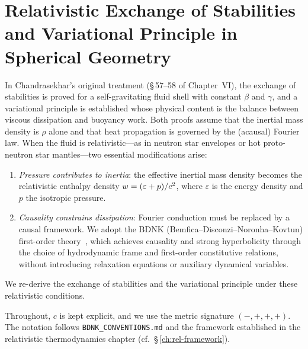 
\chapter{Relativistic Exchange of Stabilities and Variational Principle
in Spherical Geometry}
\label{ch:rel-ch6-57-58}

In Chandrasekhar's original treatment (\S\,57--58 of Chapter~VI), the
exchange of stabilities is proved for a self-gravitating fluid shell
with constant $\beta$ and $\gamma$, and a variational principle is
established whose physical content is the balance between viscous
dissipation and buoyancy work.  Both proofs assume that the inertial
mass density is $\rho$ alone and that heat propagation is governed by
the (acausal) Fourier law.  When the fluid is relativistic---as in
neutron star envelopes or hot proto-neutron star mantles---two
essential modifications arise:
\begin{enumerate}
\item \emph{Pressure contributes to inertia}: the effective inertial
  mass density becomes the relativistic enthalpy density
  $w = (\varepsilon + p)/c^{2}$, where $\varepsilon$ is the
  energy density and $p$ the isotropic pressure.
\item \emph{Causality constrains dissipation}: Fourier conduction must
  be replaced by a causal framework.  We adopt the BDNK
  (Bemfica--Disconzi--Noronha--Kovtun) first-order
  theory~\cite{BemficaDN2018,Kovtun2019,BemficaDN2019}, which achieves
  causality and strong hyperbolicity through the choice of hydrodynamic
  frame and first-order constitutive relations, without introducing
  relaxation equations or auxiliary dynamical variables.
\end{enumerate}
We re-derive the exchange of stabilities and the variational principle
under these relativistic conditions.

Throughout, $c$ is kept explicit, and we use the metric signature
$(-,+,+,+)$.  The notation follows \texttt{BDNK\_CONVENTIONS.md}
and the framework established in the relativistic thermodynamics chapter
(cf.\ \S\,\ref{ch:rel-framework}).


